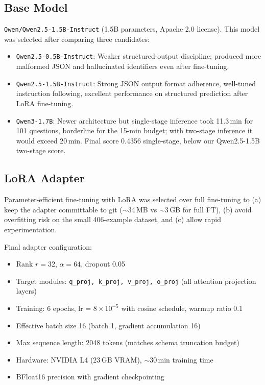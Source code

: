 \documentclass[10pt,twocolumn]{article}
\begin{document}
\subsection*{Base Model}
\texttt{Qwen/Qwen2.5-1.5B-Instruct} (1.5B parameters, Apache 2.0 license). This model was selected after comparing three candidates:
\begin{itemize}[noitemsep,topsep=2pt]
  \item \texttt{Qwen2.5-0.5B-Instruct}: Weaker structured-output discipline; produced more malformed JSON and hallucinated identifiers even after fine-tuning.
  \item \texttt{Qwen2.5-1.5B-Instruct}: Strong JSON output format adherence, well-tuned instruction following, excellent performance on structured prediction after LoRA fine-tuning.
  \item \texttt{Qwen3-1.7B}: Newer architecture but single-stage inference took 11.3\,min for 101 questions, borderline for the 15-min budget; with two-stage inference it would exceed 20\,min. Final score 0.4356 single-stage, below our Qwen2.5-1.5B two-stage score.
\end{itemize}

\subsection*{LoRA Adapter}
Parameter-efficient fine-tuning with LoRA was selected over full fine-tuning to (a) keep the adapter committable to git ($\sim$34\,MB vs $\sim$3\,GB for full FT), (b) avoid overfitting risk on the small 406-example dataset, and (c) allow rapid experimentation.

Final adapter configuration:
\begin{itemize}[noitemsep,topsep=2pt]
  \item Rank $r=32$, $\alpha=64$, dropout 0.05
  \item Target modules: \texttt{q\_proj, k\_proj, v\_proj, o\_proj} (all attention projection layers)
  \item Training: 6 epochs, lr = $8 \times 10^{-5}$ with cosine schedule, warmup ratio 0.1
  \item Effective batch size 16 (batch 1, gradient accumulation 16)
  \item Max sequence length: 2048 tokens (matches schema truncation budget)
  \item Hardware: NVIDIA L4 (23\,GB VRAM), $\sim$30\,min training time
  \item BFloat16 precision with gradient checkpointing
\end{itemize}
\end{document}
